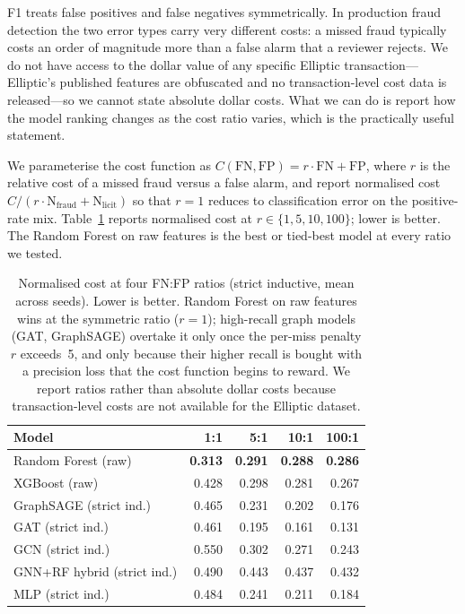 F1 treats false positives and false negatives symmetrically.  In
production fraud detection the two error types carry very different
costs: a missed fraud typically costs an order of magnitude more than
a false alarm that a reviewer rejects.  We do not have access to the
dollar value of any specific Elliptic transaction---Elliptic's
published features are obfuscated and no transaction-level cost data
is released---so we cannot state absolute dollar costs.  What we can
do is report how the model ranking changes as the cost ratio varies,
which is the practically useful statement.

We parameterise the cost function as
$C(\mathrm{FN}, \mathrm{FP}) = r \cdot \mathrm{FN} + \mathrm{FP}$,
where $r$ is the relative cost of a missed fraud versus a false
alarm, and report normalised cost
$C / (r \cdot \mathrm{N}_{\mathrm{fraud}} + \mathrm{N}_{\mathrm{licit}})$
so that $r = 1$ reduces to classification error on the positive-rate
mix.  Table~\ref{tab:cost_sweep} reports normalised cost at
$r \in \{1, 5, 10, 100\}$; lower is better.  The Random Forest on
raw features is the best or tied-best model at every ratio we tested.

\begin{table}[!htbp]
\centering
\caption{Normalised cost at four FN:FP ratios (strict inductive, mean
  across seeds).  Lower is better.  Random Forest on raw features
  wins at the symmetric ratio ($r=1$); high-recall graph models
  (GAT, GraphSAGE) overtake it only once the per-miss penalty $r$
  exceeds~5, and only because their higher recall is bought with a
  precision loss that the cost function begins to reward.  We report
  ratios rather than absolute dollar costs because transaction-level
  costs are not available for the Elliptic dataset.}
\label{tab:cost_sweep}
\small
\begin{tabular}{lrrrr}
\toprule
\textbf{Model} & \textbf{1:1} & \textbf{5:1}
  & \textbf{10:1} & \textbf{100:1} \\
\midrule
Random Forest (raw)  & \textbf{0.313} & \textbf{0.291} & \textbf{0.288} & \textbf{0.286} \\
XGBoost (raw)        & 0.428 & 0.298 & 0.281 & 0.267 \\
GraphSAGE (strict ind.) & 0.465 & 0.231 & 0.202 & 0.176 \\
GAT (strict ind.)    & 0.461 & 0.195 & 0.161 & 0.131 \\
GCN (strict ind.)    & 0.550 & 0.302 & 0.271 & 0.243 \\
GNN+RF hybrid (strict ind.) & 0.490 & 0.443 & 0.437 & 0.432 \\
MLP (strict ind.)    & 0.484 & 0.241 & 0.211 & 0.184 \\
\bottomrule
\end{tabular}
\end{table}

